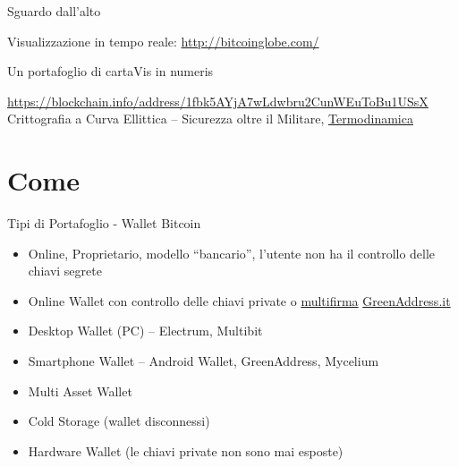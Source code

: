 \documentclass[english,compress]{beamer}
\begin{document}
\begin{frame}{Sguardo dall'alto}


\begin{scriptsize}Visualizzazione in tempo reale: \url{http://bitcoinglobe.com/}\end{scriptsize}
\end{frame}

\begin{frame}{Un portafoglio di carta}{Vis in numeris}
 \vfill
 \begin{tiny}
 \url{https://blockchain.info/address/1fbk5AYjA7wLdwbru2CunWEuToBu1USsX}
 \vfill
 \vfill
 Crittografia a Curva Ellittica -- Sicurezza oltre il Militare, \href{http://miguelmoreno.net/wp-content/uploads/2013/05/fYFBsqp.jpg}{Termodinamica}
 \end{tiny}
\end{frame}

\section{Come}

\begin{frame}{Tipi di Portafoglio - Wallet Bitcoin}
   \begin{itemize}
    \item Online, Proprietario, modello ``bancario'', l'utente non ha il controllo delle chiavi segrete
    \item Online Wallet con controllo delle chiavi private o \underline{multifirma} \url{GreenAddress.it}
    \item Desktop Wallet (PC) --  Electrum, Multibit
    \item Smartphone Wallet -- Android Wallet, GreenAddress, Mycelium
    \item Multi Asset Wallet
     \item Cold Storage (wallet disconnessi)
    \item Hardware Wallet (le chiavi private non sono mai esposte)
  \end{itemize}

\end{frame}
\end{document}
